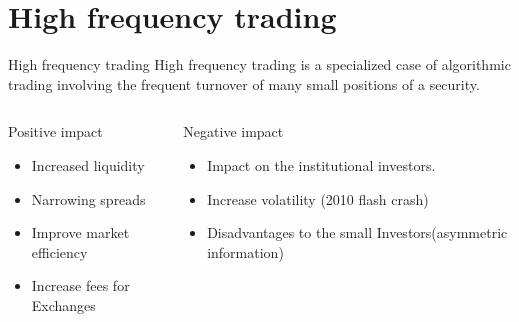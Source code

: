 \documentclass[xcolor={x11names,svgnames,dvipsnames}]{beamer}
\begin{document}
\section{High frequency trading}
\begin{frame}


\begin{block}{High frequency trading}
High frequency trading is a specialized case of algorithmic trading involving the \alert{frequent turnover} of many \alert{small positions} of a security.
\end{block}

\begin{columns}
\column{2.3in}
\begin{block}{Positive impact}
\begin{itemize}
\item Increased liquidity
\item Narrowing spreads
\item Improve market efficiency
\item Increase fees for Exchanges  
\end{itemize}
\end{block}

\column{2.3in}
\begin{block}{Negative impact }
\begin{itemize}
\item Impact on the institutional investors.
\item Increase volatility (2010 flash crash)
\item Disadvantages to the small Investors(\alert{asymmetric information})
\end{itemize}
\end{block}
\end{columns}

\end{frame}
\end{document}
